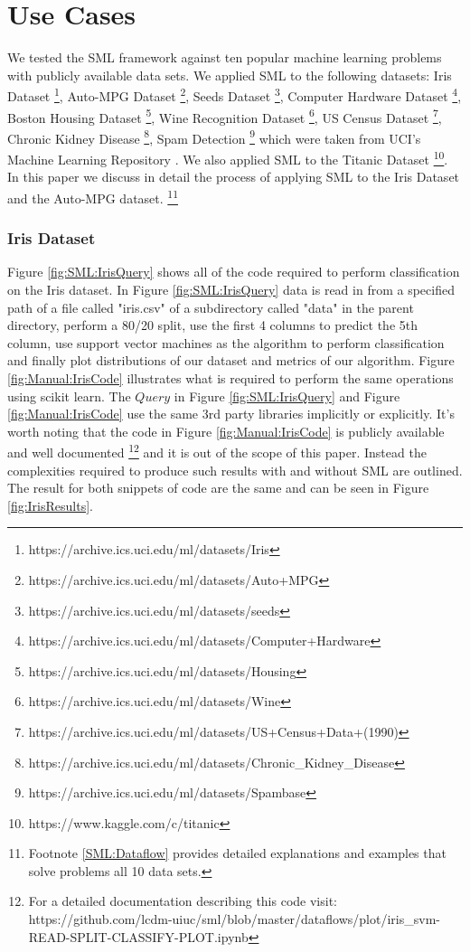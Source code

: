 \documentclass[jair,twoside,11pt,theapa]{article}
\begin{document}
\section{Use Cases}
\label{use-cases}

We tested the SML framework against ten popular machine learning problems with publicly available data sets. We applied SML to the following datasets: Iris Dataset \footnote{https://archive.ics.uci.edu/ml/datasets/Iris}, Auto-MPG Dataset \footnote{https://archive.ics.uci.edu/ml/datasets/Auto+MPG}, Seeds Dataset \footnote{https://archive.ics.uci.edu/ml/datasets/seeds}, Computer Hardware Dataset \footnote{https://archive.ics.uci.edu/ml/datasets/Computer+Hardware}, Boston Housing Dataset \footnote{https://archive.ics.uci.edu/ml/datasets/Housing}, Wine Recognition Dataset \footnote{https://archive.ics.uci.edu/ml/datasets/Wine}, US Census Dataset \footnote{https://archive.ics.uci.edu/ml/datasets/US+Census+Data+(1990)}, Chronic Kidney Disease \footnote{https://archive.ics.uci.edu/ml/datasets/Chronic\_Kidney\_Disease}, Spam Detection \footnote{https://archive.ics.uci.edu/ml/datasets/Spambase} which were taken from UCI's Machine Learning Repository \cite{Lichman:2013}. We also applied SML to the Titanic Dataset \footnote{https://www.kaggle.com/c/titanic}. In this paper we discuss in detail the process of applying SML to the Iris Dataset and the Auto-MPG dataset. \footnote{Footnote \ref{SML:Dataflow} provides detailed explanations and examples that solve problems all 10 data sets.}

\subsubsection{Iris Dataset}
Figure \ref{fig:SML:IrisQuery} shows all of the code required to perform classification on the Iris dataset. In Figure \ref{fig:SML:IrisQuery} data is read in from a specified path of a file called "iris.csv" of a subdirectory called "data" in the parent directory, perform a 80/20 split, use the first 4 columns to predict the 5th column, use support vector machines as the algorithm to perform classification and finally plot distributions of our dataset  and metrics of our algorithm. Figure \ref{fig:Manual:IrisCode} illustrates what is required to perform the same operations using scikit learn. The \(Query\) in Figure \ref{fig:SML:IrisQuery} and Figure \ref{fig:Manual:IrisCode} use the same 3rd party libraries implicitly or explicitly. It's worth noting that the code in Figure \ref{fig:Manual:IrisCode} is publicly available and well documented \footnote{For a detailed documentation describing this code visit: https://github.com/lcdm-uiuc/sml/blob/master/dataflows/plot/iris\_svm-READ-SPLIT-CLASSIFY-PLOT.ipynb} and it is out of the scope of this paper. Instead the complexities required to produce such results with and without SML are outlined. The result for both snippets of code are the same and can be seen in Figure \ref{fig:IrisResults}.
\end{document}
